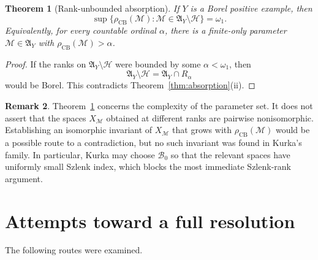 \documentclass[11pt]{article}
\newtheorem{theorem}{Theorem}[section]
\theoremstyle{definition}
\newtheorem{remark}[theorem]{Remark}
\newcommand{\A}{\mathfrak A}
\newcommand{\Hh}{\mathcal H}
\newcommand{\Bzero}{\mathcal B_0}
\newcommand{\rank}{\rho_{\mathrm{CB}}}
\begin{document}
\begin{theorem}[Rank-unbounded absorption]\label{thm:rank}
If \(Y\) is a Borel positive example, then
\[
 \sup\{\rank(\mathcal M):
       \mathcal M\in\A_Y\setminus\Hh\}=\omega_1.
\]
Equivalently, for every countable ordinal \(\alpha\), there is a finite-only
parameter \(\mathcal M\in\A_Y\) with
\(\rank(\mathcal M)>\alpha\).
\end{theorem}

\begin{proof}
If the ranks on \(\A_Y\setminus\Hh\) were bounded by some
\(\alpha<\omega_1\), then
\[
       \A_Y\setminus\Hh=\A_Y\cap R_\alpha
\]
would be Borel.  This contradicts Theorem~\ref{thm:absorption}(ii).
\end{proof}

\begin{remark}
Theorem~\ref{thm:rank} concerns the complexity of the parameter set.  It does
not assert that the spaces \(X_{\mathcal M}\) obtained at different ranks are
pairwise nonisomorphic.  Establishing an isomorphic invariant of
\(X_{\mathcal M}\) that grows with \(\rank(\mathcal M)\) would be a possible
route to a contradiction, but no such invariant was found in Kurka's family.
In particular, Kurka may choose \(\Bzero\) so that the relevant spaces have
uniformly small Szlenk index, which blocks the most immediate Szlenk-rank
argument.
\end{remark}

\section{Attempts toward a full resolution}

The following routes were examined.
\end{document}
